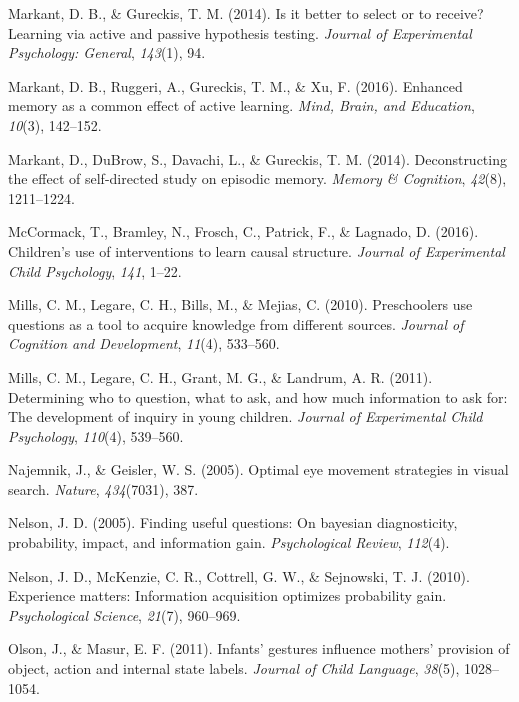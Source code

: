 \documentclass[a4paper,man,apacite,floatsintext]{apa6}
\begin{document}
\hypertarget{ref-markant2014better}{}
Markant, D. B., \& Gureckis, T. M. (2014). Is it better to select or to
receive? Learning via active and passive hypothesis testing.
\emph{Journal of Experimental Psychology: General}, \emph{143}(1), 94.

\hypertarget{ref-markant2016enhanced}{}
Markant, D. B., Ruggeri, A., Gureckis, T. M., \& Xu, F. (2016). Enhanced
memory as a common effect of active learning. \emph{Mind, Brain, and
Education}, \emph{10}(3), 142--152.

\hypertarget{ref-markant2014deconstructing}{}
Markant, D., DuBrow, S., Davachi, L., \& Gureckis, T. M. (2014).
Deconstructing the effect of self-directed study on episodic memory.
\emph{Memory \& Cognition}, \emph{42}(8), 1211--1224.

\hypertarget{ref-mccormack2016children}{}
McCormack, T., Bramley, N., Frosch, C., Patrick, F., \& Lagnado, D.
(2016). Children's use of interventions to learn causal structure.
\emph{Journal of Experimental Child Psychology}, \emph{141}, 1--22.

\hypertarget{ref-mills2010preschoolers}{}
Mills, C. M., Legare, C. H., Bills, M., \& Mejias, C. (2010).
Preschoolers use questions as a tool to acquire knowledge from different
sources. \emph{Journal of Cognition and Development}, \emph{11}(4),
533--560.

\hypertarget{ref-mills2011determining}{}
Mills, C. M., Legare, C. H., Grant, M. G., \& Landrum, A. R. (2011).
Determining who to question, what to ask, and how much information to
ask for: The development of inquiry in young children. \emph{Journal of
Experimental Child Psychology}, \emph{110}(4), 539--560.

\hypertarget{ref-najemnik2005optimal}{}
Najemnik, J., \& Geisler, W. S. (2005). Optimal eye movement strategies
in visual search. \emph{Nature}, \emph{434}(7031), 387.

\hypertarget{ref-nelson2005finding}{}
Nelson, J. D. (2005). Finding useful questions: On bayesian
diagnosticity, probability, impact, and information gain.
\emph{Psychological Review}, \emph{112}(4).

\hypertarget{ref-nelson2010experience}{}
Nelson, J. D., McKenzie, C. R., Cottrell, G. W., \& Sejnowski, T. J.
(2010). Experience matters: Information acquisition optimizes
probability gain. \emph{Psychological Science}, \emph{21}(7), 960--969.

\hypertarget{ref-olson2011infants}{}
Olson, J., \& Masur, E. F. (2011). Infants' gestures influence mothers'
provision of object, action and internal state labels. \emph{Journal of
Child Language}, \emph{38}(5), 1028--1054.
\end{document}
